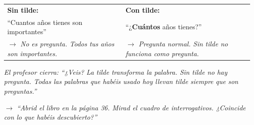 \documentclass[a4paper,10pt]{article}
\begin{document}
\vspace{0.2cm}

\begin{tcolorbox}[colback=white, colframe=naranja, boxrule=0.8pt, arc=3pt, title={\textbf{Par 4}}, fonttitle=\bfseries\small]
\begin{tabular}{@{}p{7cm} p{7cm}@{}}
\textbf{Sin tilde:} & \textbf{Con tilde:} \\[4pt]
{\large ``Cuantos años tienes son importantes''} & {\large ``¿\textbf{Cuántos} años tienes?''} \\[4pt]
\textit{$\to$ No es pregunta. Todos tus años son importantes.} & \textit{$\to$ Pregunta normal. Sin tilde no funciona como pregunta.} \\
\end{tabular}
\end{tcolorbox}

\vspace{0.3cm}

\begin{tcolorbox}[colback=naranja!8, colframe=naranja, boxrule=0.8pt, arc=3pt]
\textit{El profesor cierra: ``¿Veis? La tilde transforma la palabra. Sin tilde no hay pregunta. Todas las palabras que habéis usado hoy llevan tilde siempre que son preguntas.''}

\vspace{0.2cm}

$\to$ \textit{``Abrid el libro en la página 36. Mirad el cuadro de interrogativos. ¿Coincide con lo que habéis descubierto?''}
\end{tcolorbox}
\end{document}

